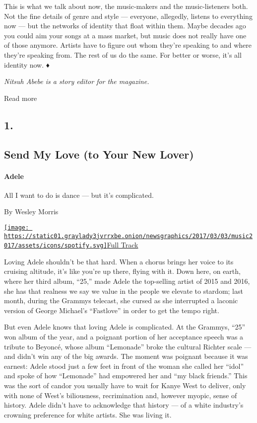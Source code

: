 This is what we talk about now, the music-makers and the music-listeners
both. Not the fine details of genre and style --- everyone, allegedly,
listens to everything now --- but the networks of identity that float
within them. Maybe decades ago you could aim your songs at a mass
market, but music does not really have one of those anymore. Artists
have to figure out whom they're speaking to and where they're speaking
from. The rest of us do the same. For better or worse, it's all identity
now. ♦

\emph{Nitsuh Abebe is a story editor for the magazine.}

Read more

\hypertarget{1}{%
\subsection{1.}\label{1}}

\hypertarget{--send-my-love-to-your-new-lover}{%
\subsection{\texorpdfstring{ Send My Love (to Your New
Lover)}{  Send My Love (to Your New Lover)}}\label{--send-my-love-to-your-new-lover}}

\hypertarget{adele}{%
\paragraph{Adele}\label{adele}}

All I want to do is dance --- but it's complicated.

By Wesley Morris

\href{https://open.spotify.com/track/3LGxef3inmn5jMLGDz9lqw}{\texttt{[image: https://static01.graylady3jvrrxbe.onion/newsgraphics/2017/03/03/music2017/assets/icons/spotify.svg]}Full
Track}

Loving Adele shouldn't be that hard. When a chorus brings her voice to
its cruising altitude, it's like you're up there, flying with it. Down
here, on earth, where her third album, ``25,'' made Adele the
top-selling artist of 2015 and 2016, she has that realness we say we
value in the people we elevate to stardom; last month, during the
Grammys telecast, she cursed as she interrupted a laconic version of
George Michael's ``Fastlove'' in order to get the tempo right.

But even Adele knows that loving Adele is complicated. At the Grammys,
``25'' won album of the year, and a poignant portion of her acceptance
speech was a tribute to Beyoncé, whose album ``Lemonade'' broke the
cultural Richter scale --- and didn't win any of the big awards. The
moment was poignant because it was earnest: Adele stood just a few feet
in front of the woman she called her ``idol'' and spoke of how
``Lemonade'' had empowered her and ``my black friends.'' This was the
sort of candor you usually have to wait for Kanye West to deliver, only
with none of West's biliousness, recrimination and, however myopic,
sense of history. Adele didn't have to acknowledge that history --- of a
white industry's crowning preference for white artists. She was living
it.

